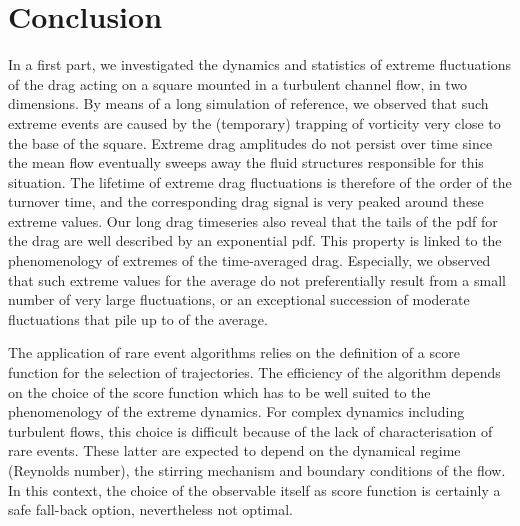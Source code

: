 \documentclass{jfm}
\newcommand{\EL}[1]{{\color{myred}{#1}}}
\begin{document}
      

\section{Conclusion}
\label{conlusion}


In a first part, we investigated the dynamics and statistics of extreme fluctuations of the drag acting on a square mounted in a turbulent channel flow, in two dimensions.
By means of a long simulation of reference, we observed that such extreme events are caused by the (temporary) trapping of vorticity very close to the base of the square.
Extreme drag amplitudes do not persist over time since the mean flow eventually sweeps away the fluid structures responsible for this situation.
%
The lifetime of extreme drag fluctuations is therefore of the order of the turnover time, and the corresponding drag signal is very peaked around these extreme values.
Our long drag timeseries also reveal that the tails of the \ac{pdf} for the drag are well described by an exponential \ac{pdf}.
This property is linked to the phenomenology of extremes of the time-averaged drag.
Especially, we observed that such extreme values for the average do not preferentially result from a small number of very large fluctuations, or an exceptional succession of moderate fluctuations that pile up to \EL{yield a large value} of the average.

The application of rare event algorithms relies on the definition of a score function for the selection of trajectories.
The efficiency of the algorithm depends on the choice of the score function which has to be well suited to the phenomenology of the extreme dynamics.
For complex dynamics including turbulent flows, this choice is  difficult because of the lack of characterisation of rare events. These latter are expected to depend on the dynamical regime (Reynolds number), the stirring mechanism and boundary conditions of the flow. In this context, the choice of the observable itself as score function is certainly a safe fall-back option, nevertheless not optimal.
\end{document}
